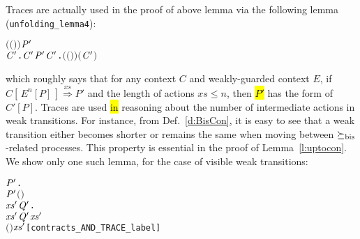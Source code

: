 Traces are actually used in the proof of above lemma via 
the following lemma (\texttt{unfolding_lemma4}):
\begin{alltt}
\HOLTokenTurnstile{}   \HOLSymConst{\HOLTokenConj{}}   \HOLSymConst{\HOLTokenConj{}}  \ensuremath{(}\ensuremath{(} \HOLSymConst{\HOLTokenCompose}   \ensuremath{)} \ensuremath{)}  \ensuremath{\HOLFreeVar{P}\sp{\prime}} \HOLSymConst{\HOLTokenConj{}}   \HOLSymConst{\HOLTokenLeq{}}  \HOLSymConst{\HOLTokenImp{}}
   \HOLSymConst{\HOLTokenExists{}}\ensuremath{\HOLBoundVar{C}\sp{\prime}}.  \ensuremath{\HOLBoundVar{C}\sp{\prime}} \HOLSymConst{\HOLTokenConj{}} \ensuremath{\HOLFreeVar{P}\sp{\prime}} \HOLSymConst{\ensuremath{=}} \ensuremath{\HOLBoundVar{C}\sp{\prime}}  \HOLSymConst{\HOLTokenConj{}} \HOLSymConst{\HOLTokenForall{}}.  \ensuremath{(}\ensuremath{(} \HOLSymConst{\HOLTokenCompose}   \ensuremath{)} \ensuremath{)}  \ensuremath{(}\ensuremath{\HOLBoundVar{C}\sp{\prime}} \ensuremath{)}
\end{alltt}
which roughly says that for any context $C$ and weakly-guarded context
$E$, if $C [\, E^n[P]\,] \overset{xs}{\Longrightarrow} P'$ and the length
of actions $xs \leqslant n$, then \hl{$P'$} has the form of $C'[P]$.
Traces are used \hl{in} reasoning about the number of intermediate actions in weak
transitions. For instance, from Def.~\ref{d:BisCon}, it is easy
to see that a weak transition either becomes shorter
or remains the same when moving between $\mathrel{\succeq_{\rm{bis}}}$-related processes.
This property is essential in the proof of
Lemma~\ref{l:uptocon}. We show only one such lemma, for the case of
visible weak transitions:
\begin{alltt}
\HOLTokenTurnstile{}  \HOLSymConst{\HOLTokenContracts{}}  \HOLSymConst{\HOLTokenImp{}}
   \HOLSymConst{\HOLTokenForall{}}  \ensuremath{\HOLBoundVar{P}\sp{\prime}}.
          \ensuremath{\HOLBoundVar{P}\sp{\prime}} \HOLSymConst{\HOLTokenConj{}}  \ensuremath{(} \ensuremath{)}  \HOLSymConst{\HOLTokenImp{}}
       \HOLSymConst{\HOLTokenExists{}}\ensuremath{\HOLBoundVar{xs}\sp{\prime}} \ensuremath{\HOLBoundVar{Q}\sp{\prime}}.
             \ensuremath{\HOLBoundVar{xs}\sp{\prime}} \ensuremath{\HOLBoundVar{Q}\sp{\prime}} \HOLSymConst{\HOLTokenConj{}}  \HOLSymConst{\HOLTokenContracts{}}  \HOLSymConst{\HOLTokenConj{}}  \ensuremath{\HOLBoundVar{xs}\sp{\prime}} \HOLSymConst{\HOLTokenLeq{}}   \HOLSymConst{\HOLTokenConj{}}
            \ensuremath{(} \ensuremath{)} \ensuremath{\HOLBoundVar{xs}\sp{\prime}}\hfill{[contracts_AND_TRACE_label]}
\end{alltt}

